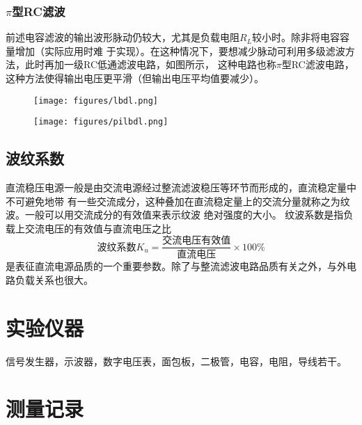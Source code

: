 \documentclass{article}
\begin{document}
\subsubsection*{$\pi$型RC滤波}
前述电容滤波的输出波形脉动仍较大，尤其是负载电阻$R_L$较小时。除非将电容容量增加（实际应用时难
于实现）。在这种情况下，要想减少脉动可利用多级滤波方法，此时再加一级RC低通滤波电路，如图所示，
这种电路也称$\pi$型RC滤波电路，这种方法使得输出电压更平滑（但输出电压平均值要减少）。

\begin{figure}[htbp]
    \centering
    \begin{minipage}[t]{0.48\textwidth}
        \centering
        \texttt{[image: figures/lbdl.png]}

    \end{minipage}
    \begin{minipage}[t]{0.48\textwidth}
        \centering
        \texttt{[image: figures/pilbdl.png]}
    \end{minipage}
\end{figure}

\subsection*{波纹系数}
直流稳压电源一般是由交流电源经过整流滤波稳压等环节而形成的，直流稳定量中不可避免地带
有一些交流成分，这种叠加在直流稳定量上的交流分量就称之为纹波。一般可以用交流成分的有效值来表示纹波
绝对强度的大小。 纹波系数是指负载上交流电压的有效值与直流电压之比
\begin{equation*}
    \text{波纹系数}K_u=\frac{\text{交流电压有效值}}{\text{直流电压}}\times 100\%
\end{equation*}
是表征直流电源品质的一个重要参数。除了与整流滤波电路品质有关之外，与外电路负载关系也很大。

\section*{实验仪器}
信号发生器，示波器，数字电压表，面包板，二极管，电容，电阻，导线若干。

\section*{测量记录}
\end{document}
